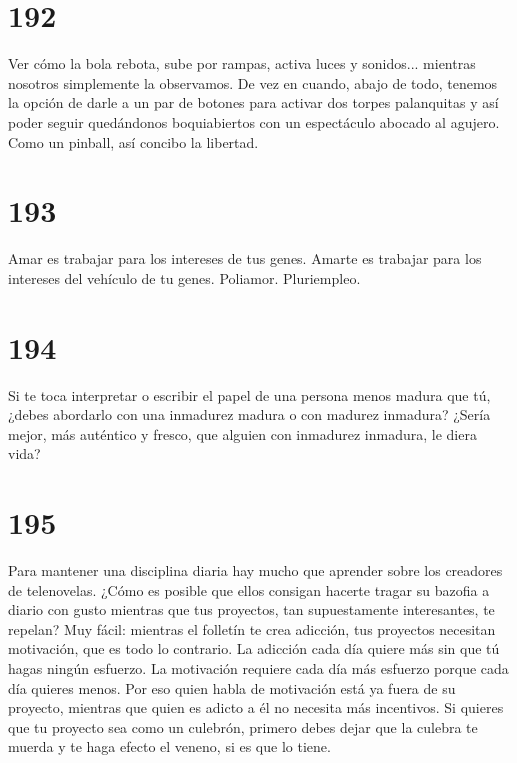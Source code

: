 \documentclass[a4paper,11pt,openright,twocolumn]{book}
\begin{document}
\section*{192}

Ver cómo la bola rebota, sube por rampas, activa luces y sonidos... mientras nosotros
simplemente la observamos. De vez en cuando, abajo de todo, tenemos la opción de darle
a un par de botones para activar dos torpes palanquitas y así poder seguir quedándonos
boquiabiertos con un espectáculo abocado al agujero. Como un pinball, así concibo
la libertad. 

\section*{193}

Amar es trabajar para los intereses de tus genes.
Amarte es trabajar para los intereses del vehículo de tu genes.
Poliamor. Pluriempleo. 

\section*{194}

Si te toca interpretar o escribir el papel de una persona menos madura que tú, 
¿debes abordarlo con una inmadurez madura o con madurez inmadura? 
¿Sería mejor, más auténtico y fresco, que alguien con inmadurez inmadura, le diera vida? 

\section*{195}

Para mantener una disciplina diaria hay mucho que aprender sobre los creadores
de telenovelas. ¿Cómo es posible que ellos consigan hacerte tragar su
bazofia a diario con gusto mientras que tus proyectos, tan supuestamente
interesantes, te repelan? Muy fácil: mientras el folletín te crea adicción, 
tus proyectos necesitan motivación, que es todo lo contrario. La adicción cada
día quiere más sin que tú hagas ningún esfuerzo. La motivación requiere cada día
más esfuerzo porque cada día quieres menos. Por eso quien habla de motivación está
ya fuera de su proyecto, mientras que quien es adicto a él no necesita más
incentivos. Si quieres que tu proyecto sea como un culebrón, primero debes dejar
que la culebra te muerda y te haga efecto el veneno, si es que lo tiene. 
\end{document}
